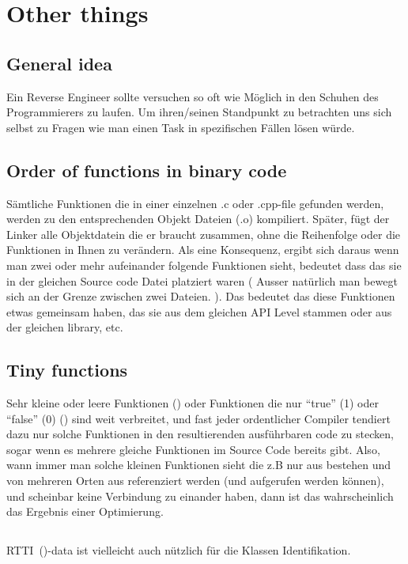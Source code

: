 \section{Other things}  %

\subsection{General idea}  %

Ein Reverse Engineer sollte versuchen so oft wie Möglich in den Schuhen des Programmierers zu laufen.
Um ihren/seinen Standpunkt zu betrachten uns sich selbst zu Fragen wie man einen Task in spezifischen Fällen lösen würde.

\subsection{Order of functions in binary code}  %

Sämtliche Funktionen die in einer einzelnen .c oder .cpp-file gefunden werden, werden zu den entsprechenden Objekt Dateien (.o) kompiliert. 
Später, fügt der Linker alle Objektdatein die er braucht zusammen, ohne die Reihenfolge oder die Funktionen in Ihnen zu verändern. 
Als eine Konsequenz, ergibt sich daraus wenn man zwei oder mehr aufeinander folgende Funktionen sieht, bedeutet dass das sie in der 
gleichen Source code Datei platziert waren ( Ausser natürlich man bewegt sich an der Grenze zwischen zwei Dateien. ).  Das bedeutet
das diese Funktionen etwas gemeinsam haben, das sie aus dem gleichen \ac{API} Level stammen oder aus der gleichen library, etc.

\subsection{Tiny functions}  %

Sehr kleine oder leere Funktionen  ()
oder Funktionen die nur ``true'' (1) oder ``false'' (0) () sind weit verbreitet,
und fast jeder ordentlicher Compiler tendiert dazu nur solche Funktionen in den resultierenden ausführbaren code zu stecken,
sogar wenn es mehrere gleiche Funktionen im Source Code bereits gibt. 
Also, wann immer man solche kleinen Funktionen sieht die z.B nur aus  bestehen und von mehreren 
Orten aus referenziert werden (und aufgerufen werden können), und scheinbar keine Verbindung zu einander haben, dann 
ist das wahrscheinlich das Ergebnis einer Optimierung. 

\subsection{\Cpp}

\ac{RTTI}~()-data ist vielleicht auch nützlich für die \Cpp Klassen Identifikation.




